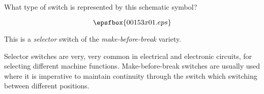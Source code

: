 

What type of switch is represented by this schematic symbol?

$$\epsfbox{00153x01.eps}$$







This is a {\it selector} switch of the {\it make-before-break} variety.







Selector switches are very, very common in electrical and electronic circuits, for selecting different machine functions.  Make-before-break switches are usually used where it is imperative to maintain continuity through the switch which switching between different positions.




